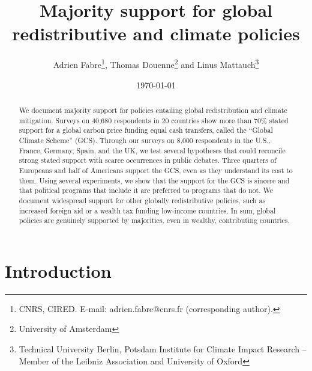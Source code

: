 \documentclass[12pt,english]{article}
\title{Majority support for global redistributive and climate policies
}
\author{Adrien Fabre\footnote{CNRS, CIRED. E-mail: adrien.fabre@cnrs.fr (corresponding author).}, Thomas Douenne\footnote{University of Amsterdam}\; and Linus Mattauch\footnote{Technical University Berlin, Potsdam Institute for Climate Impact Research -- Member of the Leibniz Association and University of Oxford}
} %
\date{\today} %
\begin{document}
\maketitle

\begin{center}
\end{center}

\begin{abstract}

  We document majority support for policies entailing global redistribution and climate mitigation. Surveys on 40,680 respondents in 20 countries show more than 70\% stated support for a global carbon price funding equal cash transfers, called the ``Global Climate Scheme'' (GCS). Through our %
  surveys on 8,000 respondents in the U.S., France, Germany, Spain, and the UK, we test several hypotheses that could reconcile strong stated support with scarce occurrences in public debates. 
  Three quarters of Europeans and half of Americans support the GCS, even as they understand its cost to them. Using several experiments, we show that the support for the GCS is sincere and that political programs that include it are preferred to programs that do not. %
  We document widespread support for other globally redistributive policies, such as increased foreign aid or a wealth tax funding low-income countries. In sum, global policies are genuinely supported by majorities, even in wealthy, contributing countries. 
\end{abstract}


\onehalfspacing %
\section{Introduction}%
\end{document}

